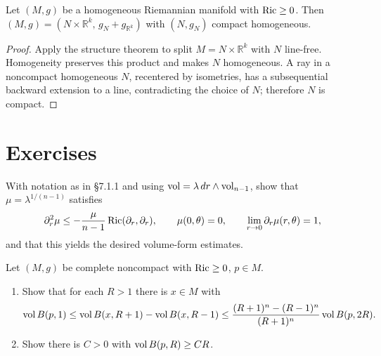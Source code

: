 \begin{theorem}
  \label{thm:pet-ch7-homogeneous-splitting}
  Let $(M,g)$ be a homogeneous Riemannian manifold with $\operatorname{Ric}\ge0$. Then
  $(M,g)=(N\times\mathbb{R}^k,\,g_N+g_{\mathbb{R}^k})$ with $(N,g_N)$ compact homogeneous.
\end{theorem}
\begin{proof}
  \sketch
  Apply the structure theorem to split \(M=N\times\mathbb R^k\) with \(N\) line-free. Homogeneity preserves this product and makes \(N\) homogeneous. A ray in a noncompact homogeneous \(N\), recentered by isometries, has a subsequential backward extension to a line, contradicting the choice of \(N\); therefore \(N\) is compact.
\end{proof}

\section{Exercises}

\begin{remark}
  \label{rem:pet-ch7-ex-1}
  With notation as in §7.1.1 and using $\operatorname{vol}=\lambda\,dr\wedge\operatorname{vol}_{n-1}$, show
  that $\mu=\lambda^{1/(n-1)}$ satisfies
  \[
    \partial_r^2\mu\le-\frac{\mu}{n-1}\operatorname{Ric}(\partial_r,\partial_r),\qquad
    \mu(0,\theta)=0,\qquad \lim_{r\to0}\partial_r\mu(r,\theta)=1,
  \]
  and that this yields the desired volume-form estimates.
\end{remark}

\begin{remark}
  \label{rem:pet-ch7-ex-2}
  Let $(M,g)$ be complete noncompact with $\operatorname{Ric}\ge0$, $p\in M$.
  \begin{enumerate}
    \item[(1)] Show that for each $R>1$ there is $x\in M$ with
    \[
      \operatorname{vol} B(p,1)\le\operatorname{vol} B(x,R+1)-\operatorname{vol} B(x,R-1)
      \le\frac{(R+1)^n-(R-1)^n}{(R+1)^n}\operatorname{vol} B(p,2R).
    \]
    \item[(2)] Show there is $C>0$ with $\operatorname{vol} B(p,R)\ge CR$.
  \end{enumerate}
\end{remark}

